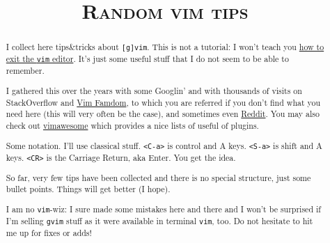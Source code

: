 \documentclass[a4paper,12pt,%
              final%
              ]{article}
\title{\color{\maincolor}\Huge\bfseries\scshape Random vim tips}
\author{\vspace{-7ex}}
\date{\vspace{-7ex}}
\newcommand{\vim}{\texttt{vim}}
\newcommand{\gvim}{\texttt{gvim}}
\begin{document}
%
%
\maketitle
%
\vspace*{-2.5cm}

\begin{abstract}
\parindent=0pt
\setlength{\parskip}{2pt}
\noindent
I collect here tips\&tricks about \texttt{[g]vim}. This is not a tutorial: I won't
teach you
\href{https://stackoverflow.com/questions/11828270/how-do-i-exit-the-vim-editor}{how
to exit the \vim{} editor}. It's just some useful stuff that I do not seem to
be able to remember.

I gathered this over the years with some Googlin' and with thousands of visits on
StackOverflow and \href{https://vim.fandom.com/wiki/Vim_Tips_Wiki}{Vim Famdom}, to
which you are referred if you don't find what you need here (this will very often be
the case), and sometimes even \href{https://www.reddit.com/r/vim/}{Reddit}. You may
also check out \href{https://vimawesome.com/}{vimawesome} which provides a nice lists
of useful of plugins.

Some notation. I'll use classical stuff. \texttt{<C-a>} is control and A keys.
\texttt{<S-a>} is shift and A keys. \texttt{<CR>} is the Carriage Return, aka Enter.
You get the idea.

So far, very few tips have been collected and there is no special structure, just
some bullet points. Things will get better (I hope).

I am no \vim{}-wiz: I sure made some mistakes here and there and I won't be
surprised if I'm selling \gvim{} stuff as it were available in terminal
\texttt{vim}, too. Do not hesitate to hit me up for fixes or adds!
\end{abstract}
%
\end{document}
